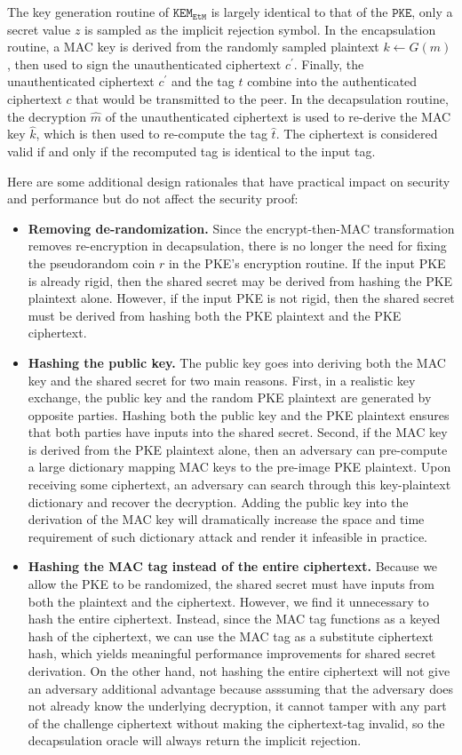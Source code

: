 \documentclass[journal=tches,submission]{iacrtrans}
\newcommand{\pke}{\texttt{PKE}}
\newcommand{\kem}{\texttt{KEM}}
\newcommand{\etm}{\texttt{EtM}}  %
\begin{document}
The key generation routine of $\kem_\etm$ is largely identical to that of the $\pke$, only a secret value $z$ is sampled as the implicit rejection symbol. In the encapsulation routine, a MAC key is derived from the randomly sampled plaintext $k \leftarrow G(m)$, then used to sign the unauthenticated ciphertext $c^\prime$. Finally, the unauthenticated ciphertext $c^\prime$ and the tag $t$ combine into the authenticated ciphertext $c$ that would be transmitted to the peer. In the decapsulation routine, the decryption $\hat{m}$ of the unauthenticated ciphertext is used to re-derive the MAC key $\hat{k}$, which is then used to re-compute the tag $\hat{t}$. The ciphertext is considered valid if and only if the recomputed tag is identical to the input tag.

Here are some additional design rationales that have practical impact on security and performance but do not affect the security proof: \begin{itemize}
    \item \textbf{Removing de-randomization.} Since the encrypt-then-MAC transformation removes re-encryption in decapsulation, there is no longer the need for fixing the pseudorandom coin $r$ in the PKE's encryption routine. If the input PKE is already rigid, then the shared secret may be derived from hashing the PKE plaintext alone. However, if the input PKE is not rigid, then the shared secret must be derived from hashing both the PKE plaintext and the PKE ciphertext. 
    \item \textbf{Hashing the public key.} The public key goes into deriving both the MAC key and the shared secret for two main reasons. First, in a realistic key exchange, the public key and the random PKE plaintext are generated by opposite parties. Hashing both the public key and the PKE plaintext ensures that both parties have inputs into the shared secret. Second, if the MAC key is derived from the PKE plaintext alone, then an adversary can pre-compute a large dictionary mapping MAC keys to the pre-image PKE plaintext. Upon receiving some ciphertext, an adversary can search through this key-plaintext dictionary and recover the decryption. Adding the public key into the derivation of the MAC key will dramatically increase the space and time requirement of such dictionary attack and render it infeasible in practice.
    \item \textbf{Hashing the MAC tag instead of the entire ciphertext.} Because we allow the PKE to be randomized, the shared secret must have inputs from both the plaintext and the ciphertext. However, we find it unnecessary to hash the entire ciphertext. Instead, since the MAC tag functions as a keyed hash of the ciphertext, we can use the MAC tag as a substitute ciphertext hash, which yields meaningful performance improvements for shared secret derivation. On the other hand, not hashing the entire ciphertext will not give an adversary additional advantage because asssuming that the adversary does not already know the underlying decryption, it cannot tamper with any part of the challenge ciphertext without making the ciphertext-tag invalid, so the decapsulation oracle will always return the implicit rejection.
\end{itemize}
\end{document}
